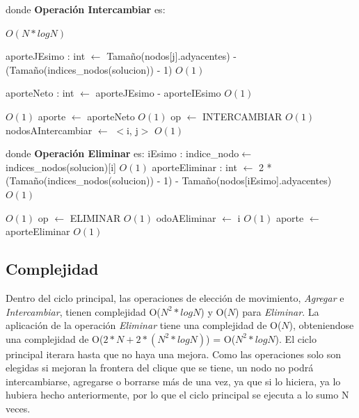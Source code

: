 \documentclass[a4paper, 10pt, twoside]{article}
\newenvironment{pseudo}[1][]{%
    \vspace{1em}%
    \begin{algorithmic}%
}
{%
    \end{algorithmic}%
    \vspace{1em}%
}
\newcommand{\Ode}[1]{\hfill $O(#1)$}
\begin{document}
\begin{pseudo}
\State
\State donde \textbf{Operación Intercambiar} es:
\State

											\Ode{N*log N}

					\State aporteJEsimo : int $\leftarrow$ Tamaño(nodos[j].adyacentes) -
					\State (Tamaño(indices\_nodos(solucion)) - 1)															\Ode{1}

					\State aporteNeto : int $\leftarrow$ aporteJEsimo - aporteIEsimo										\Ode{1}

																									\Ode{1}
						\State aporte $\leftarrow$ aporteNeto																\Ode{1}
						\State op $\leftarrow$ INTERCAMBIAR 																\Ode{1}
						\State nodosAIntercambiar $\leftarrow$ $<$i, j$>$ 													\Ode{1}
					\EndIf
				\EndIf
			\EndFor	

\State
\State donde \textbf{Operación Eliminar} es:
\State
			\State iEsimo : indice\_nodo$\leftarrow$ indices\_nodos(solucion)[i]											\Ode{1}
			\State aporteEliminar : int $\leftarrow$ 2 * (Tamaño(indices\_nodos(solucion)) - 1) - 
			\State Tamaño(nodos[iEsimo].adyacentes)																			\Ode{1}

																								\Ode{1}
				\State op $\leftarrow$ ELIMINAR 																			\Ode{1}
				\State odoAEliminar $\leftarrow$ i 																			\Ode{1}
				\State aporte $\leftarrow$ aporteEliminar 																	\Ode{1}
			\EndIf
		\EndFor


\end{pseudo}

\subsection{Complejidad}
Dentro del ciclo principal, las operaciones de elección de movimiento, \textit{Agregar} e \textit{Intercambiar}, tienen complejidad O($N^2 * log N$) y O($N$) para \textit{Eliminar}. La aplicación de la operación \textit{Eliminar} tiene una complejidad de O($N$), obteniendose una complejidad de O($2*N + 2*(N^2 * log N)$) = O($N^2 * log N$).
El ciclo principal iterara hasta que no haya una mejora. Como las operaciones solo son elegidas si mejoran la frontera del clique que se tiene, un nodo no podrá intercambiarse, agregarse o borrarse más de una vez, ya que si lo hiciera, ya lo hubiera hecho anteriormente, por lo que el ciclo principal se ejecuta a lo sumo N veces.
\end{document}
